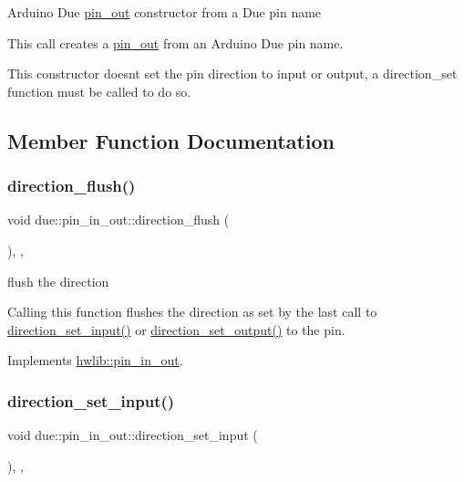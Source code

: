 Arduino Due \hyperlink{classdue_1_1pin__out}{pin\+\_\+out} constructor from a Due pin name

This call creates a \hyperlink{classdue_1_1pin__out}{pin\+\_\+out} from an Arduino Due pin name.

This constructor doesn\textquotesingle{}t set the pin direction to input or output, a direction\+\_\+set function must be called to do so. 

\subsection{Member Function Documentation}
\mbox{\label{classdue_1_1pin__in__out_aa56ac6fe5ef886f6c88eb7562ecccfca}} 
\subsubsection{\texorpdfstring{direction\+\_\+flush()}{direction\_flush()}}
{\footnotesize\ttfamily void due\+::pin\+\_\+in\+\_\+out\+::direction\+\_\+flush (\begin{DoxyParamCaption}{ }\end{DoxyParamCaption})\hspace{0.3cm}{\ttfamily [inline]}, {\ttfamily [override]}, {\ttfamily [virtual]}}

flush the direction

Calling this function flushes the direction as set by the last call to \hyperlink{classdue_1_1pin__in__out_a2ca0c81a7e1059a171c997d5015d99ea}{direction\+\_\+set\+\_\+input()} or \hyperlink{classdue_1_1pin__in__out_a45f7cf2e7f71638337f82ecf1852f884}{direction\+\_\+set\+\_\+output()} to the pin. 

Implements \hyperlink{classhwlib_1_1pin__in__out_a86ef2b296683d8c0133280075c82cb51}{hwlib\+::pin\+\_\+in\+\_\+out}.

\mbox{\label{classdue_1_1pin__in__out_a2ca0c81a7e1059a171c997d5015d99ea}} 
\subsubsection{\texorpdfstring{direction\+\_\+set\+\_\+input()}{direction\_set\_input()}}
{\footnotesize\ttfamily void due\+::pin\+\_\+in\+\_\+out\+::direction\+\_\+set\+\_\+input (\begin{DoxyParamCaption}{ }\end{DoxyParamCaption})\hspace{0.3cm}{\ttfamily [inline]}, {\ttfamily [override]}, {\ttfamily [virtual]}}

